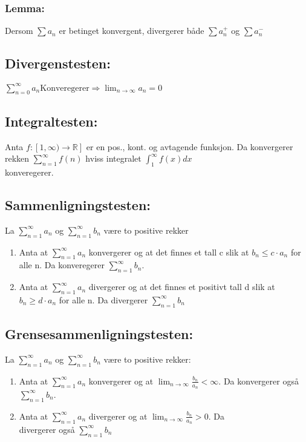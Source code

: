 \documentclass[12pt,a4paper,twocolumn,twoside]{article}
\def\real{\mathbb{R}}
\def\suminfty#1#2{\sum_{n=#1}^\infty #2}
\begin{document}
        \subsubsection*{Lemma:}
        Dersom $\sum a_n$ er betinget konvergent, divergerer både $\sum a_n^+$ og $\sum a_n^-$
        \subsection*{Divergenstesten:}
        $\sum_{n=0}^\infty a_n \text{Konveregerer} \Rightarrow \lim_{n\to\infty}a_n=0$
        \subsection*{Integraltesten:}
        Anta $f:[1,\infty)\to\real]$ er en pos., kont. og avtagende funksjon. Da konvergerer rekken $\sum_{n=1}^\infty f(n)$ hviss
        integralet $\int_1^\infty f(x)dx$ \\konveregerer.
        \subsection*{Sammenligningstesten:}
        La $\suminfty{1}{a_n}$ og $\suminfty{1}{b_n}$ være to positive rekker
        \begin{enumerate}
            \item Anta at $\suminfty{1}{a_n}$ konvergerer og at det finnes et tall c slik at $b_n \leq c\cdot a_n$ for alle n. Da konveregerer $\suminfty{1}{b_n}$.
            \item Anta at $\suminfty{1}{a_n}$ divergerer og at det finnes et positivt tall d slik at $b_n \geq d\cdot a_n$ for alle n. Da divergerer $\suminfty{1}{b_n}$
        \end{enumerate}
        \subsection*{Grensesammenligningstesten:}
        La $\suminfty{1}{a_n}$ og $\suminfty{1}{b_n}$ være to positive rekker:
        \begin{enumerate}
            \item Anta at $\suminfty{1}{a_n}$ konvergerer og at $\lim_{n\to\infty}\frac{b_n}{a_n}<\infty$. Da konvergerer også $\suminfty{1}{b_n}$.
            \item Anta at $\suminfty{1}{a_n}$ divergerer og at $\lim_{n\to\infty}\frac{b_n}{a_n}>0$. Da \\divergerer også $\suminfty{1}{b_n}$
        \end{enumerate}
\end{document}
